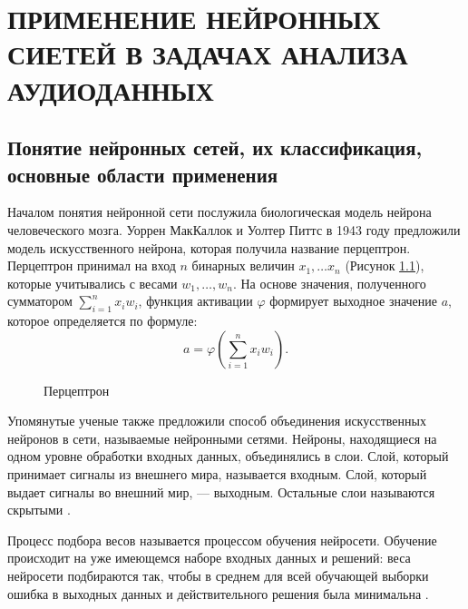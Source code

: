 \chapter{ПРИМЕНЕНИЕ НЕЙРОННЫХ СИЕТЕЙ В ЗАДАЧАХ АНАЛИЗА АУДИОДАННЫХ}
\section{Понятие нейронных сетей, их классификация, основные области применения}
Началом понятия нейронной сети послужила биологическая модель нейрона человеческого мозга.
Уоррен МакКаллок и Уолтер Питтс  в 1943 году предложили модель искусственного нейрона, 
которая получила название перцептрон. 
Перцептрон принимал на вход $n$ бинарных величин $x_1, \dots x_n$ (Рисунок \ref{fig:perceptron}),
которые учитывались с весами $w_1, \dots, w_n$. На основе значения, полученного сумматором $\sum_{i=1}^n x_i w_i$, функция активации
$\varphi$ формирует выходное значение $a$, которое определяется по формуле:
\begin{equation}
    a = \varphi \left( \sum\limits_{i=1}^n x_i w_i \right).
\end{equation}

\begin{figure}[H]
	\caption{Перцептрон}
	\label{fig:perceptron}
\end{figure}

Упомянутые ученые также предложили способ объединения искусственных нейронов в сети, называемые нейронными сетями.
Нейроны, находящиеся на одном уровне обработки входных данных, объединялись в слои.
Слой, который принимает сигналы из внешнего мира, называется входным. Слой, который выдает сигналы во внешний мир, —
выходным. Остальные слои называются скрытыми \cite{sozykin}.

Процесс подбора весов называется процессом обучения нейросети.
Обучение происходит на уже имеющемся наборе входных данных и
решений: веса нейросети подбираются так, чтобы в среднем для всей
обучающей выборки ошибка в выходных данных и действительного
решения была минимальна \cite{cyber_alex}.

